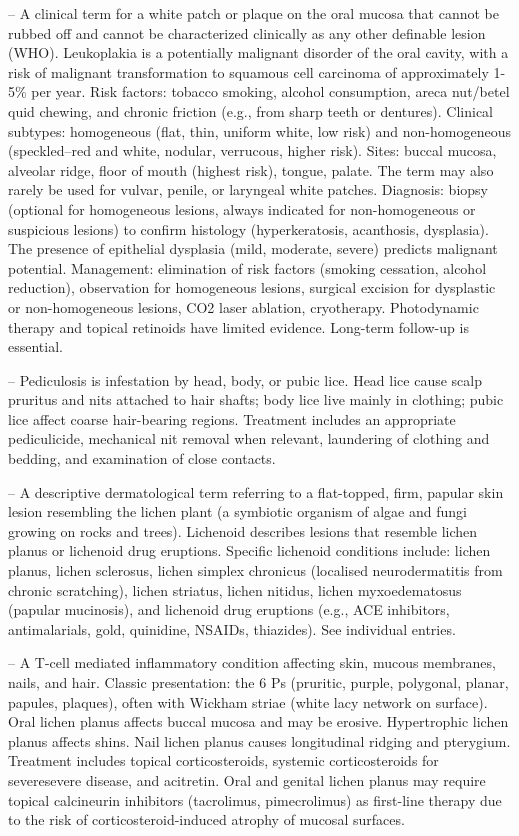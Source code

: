 -- A clinical term for a white patch or plaque on the oral mucosa that cannot be rubbed off and cannot be characterized clinically as any other definable lesion (WHO). Leukoplakia is a potentially malignant disorder of the oral cavity, with a risk of malignant transformation to squamous cell carcinoma of approximately 1-5\% per year. Risk factors: tobacco smoking, alcohol consumption, areca nut/betel quid chewing, and chronic friction (e.g., from sharp teeth or dentures). Clinical subtypes: homogeneous (flat, thin, uniform white, low risk) and non-homogeneous (speckled--red and white, nodular, verrucous, higher risk). Sites: buccal mucosa, alveolar ridge, floor of mouth (highest risk), tongue, palate. The term may also rarely be used for vulvar, penile, or laryngeal white patches. Diagnosis: biopsy (optional for homogeneous lesions, always indicated for non-homogeneous or suspicious lesions) to confirm histology (hyperkeratosis, acanthosis, dysplasia). The presence of epithelial dysplasia (mild, moderate, severe) predicts malignant potential. Management: elimination of risk factors (smoking cessation, alcohol reduction), observation for homogeneous lesions, surgical excision for dysplastic or non-homogeneous lesions, CO2 laser ablation, cryotherapy. Photodynamic therapy and topical retinoids have limited evidence. Long-term follow-up is essential.

-- Pediculosis is infestation by head, body, or pubic lice. Head lice cause scalp pruritus and nits attached to hair shafts; body lice live mainly in clothing; pubic lice affect coarse hair-bearing regions. Treatment includes an appropriate pediculicide, mechanical nit removal when relevant, laundering of clothing and bedding, and examination of close contacts.

-- A descriptive dermatological term referring to a flat-topped, firm, papular skin lesion resembling the lichen plant (a symbiotic organism of algae and fungi growing on rocks and trees). Lichenoid describes lesions that resemble lichen planus or lichenoid drug eruptions. Specific lichenoid conditions include: lichen planus, lichen sclerosus, lichen simplex chronicus (localised neurodermatitis from chronic scratching), lichen striatus, lichen nitidus, lichen myxoedematosus (papular mucinosis), and lichenoid drug eruptions (e.g., ACE inhibitors, antimalarials, gold, quinidine, NSAIDs, thiazides). See individual entries.

-- A T-cell mediated inflammatory condition affecting skin, mucous membranes, nails, and hair. Classic presentation: the 6 Ps (pruritic, purple, polygonal, planar, papules, plaques), often with Wickham striae (white lacy network on surface). Oral lichen planus affects buccal mucosa and may be erosive. Hypertrophic lichen planus affects shins. Nail lichen planus causes longitudinal ridging and pterygium. Treatment includes topical corticosteroids, systemic corticosteroids for severesevere disease, and acitretin. Oral and genital lichen planus may require topical calcineurin inhibitors (tacrolimus, pimecrolimus) as first-line therapy due to the risk of corticosteroid-induced atrophy of mucosal surfaces.

